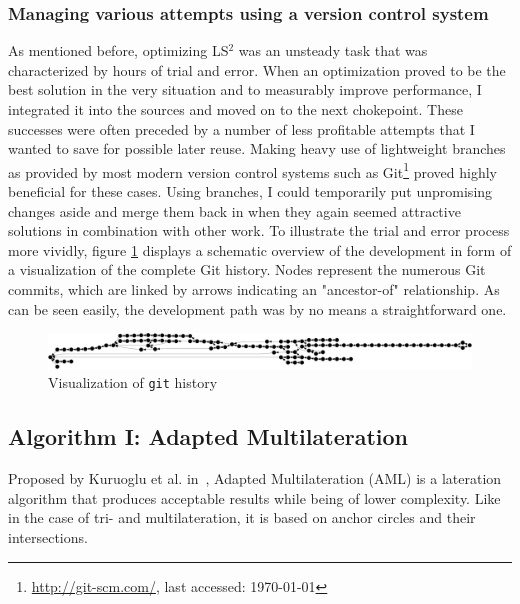 \subsubsection{Managing various attempts using a version control system}
As mentioned before, optimizing LS$^{2}$ was an unsteady task that was characterized by hours of trial and error. When an optimization proved to be the best solution in the very situation and to measurably improve performance, I integrated it into the sources and moved on to the next chokepoint. These successes were often preceded by a number of less profitable attempts that I wanted to save for possible later reuse. Making heavy use of lightweight branches as provided by most modern version control systems such as Git\footnote{\url{http://git-scm.com/}, last accessed: \today{}} proved highly beneficial for these cases. Using branches, I could temporarily put unpromising changes aside and merge them back in when they again seemed attractive solutions in combination with other work. To illustrate the trial and error process more vividly, figure \ref{fig:branchtree} displays a schematic overview of the development in form of a visualization of the complete Git history. Nodes represent the numerous Git commits, which are linked by arrows indicating an "ancestor-of" relationship. As can be seen easily, the development path was by no means a straightforward one.

\begin{figure}[h]
\begin{center}
\includegraphics[width=14cm]{img/branchtree}
\end{center}
\caption{Visualization of \texttt{git} history}
\label{fig:branchtree}
\end{figure}

\subsection{Algorithm I: Adapted Multilateration}
Proposed by Kuruoglu et al. in~\cite{kuruoglu2009aml}, Adapted Multilateration (AML) is a lateration algorithm that produces acceptable results while being of lower complexity. Like in the case of tri- and multilateration, it is based on anchor circles and their intersections.

